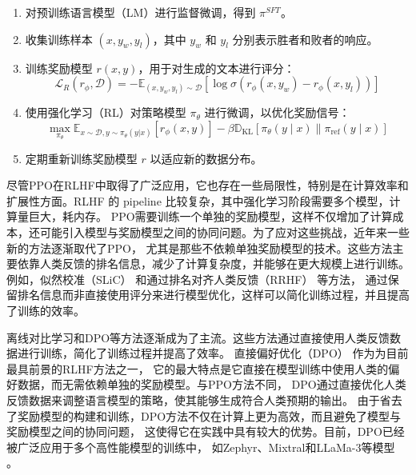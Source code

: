 \begin{enumerate}
    \item 对预训练语言模型（LM）进行监督微调，得到 $\pi^{SFT}$。
    \item 收集训练样本 $(x, y_w, y_l)$，其中 $y_w$ 和 $y_l$ 分别表示胜者和败者的响应。
    \item 训练奖励模型 $r(x, y)$，用于对生成的文本进行评分：
        \begin{equation}
            \mathcal{L}_R(r_\phi,\mathcal{D})=-\mathbb{E}_{(x,y_w,y_l)\sim\mathcal{D}}\left[\log\sigma(r_\phi(x,y_w)-r_\phi(x,y_l))\right]
        \end{equation}
    \item 使用强化学习（RL）对策略模型 $\pi_{\theta}$ 进行微调，以优化奖励信号：
        \begin{equation}
            \max_{\pi_\theta}\mathbb{E}_{x\sim\mathcal{D},y\sim\pi_\theta(y|x)}[r_\phi(x,y)]-\beta\mathbb{D}_{\mathrm{KL}}[\pi_\theta(y\mid x)\parallel\pi_{\mathrm{ref}}(y\mid x)]
        \end{equation}
    \item 定期重新训练奖励模型 $r$ 以适应新的数据分布。
\end{enumerate}

尽管PPO在RLHF中取得了广泛应用，它也存在一些局限性，特别是在计算效率和扩展性方面。RLHF 的 pipeline 比较复杂，其中强化学习阶段需要多个模型，计算量巨大，耗内存。
PPO需要训练一个单独的奖励模型，这样不仅增加了计算成本，还可能引入模型与奖励模型之间的协同问题。为了应对这些挑战，近年来一些新的方法逐渐取代了PPO，
尤其是那些不依赖单独奖励模型的技术。这些方法主要依靠人类反馈的排名信息，减少了计算复杂度，并能够在更大规模上进行训练。
例如，似然校准（SLiC） \citep{zhao2023slic} 和通过排名对齐人类反馈（RRHF） \citep{yuan2023rrhf}等方法，
通过保留排名信息而非直接使用评分来进行模型优化，这样可以简化训练过程，并且提高了训练的效率。

离线对比学习和DPO等方法逐渐成为了主流。这些方法通过直接使用人类反馈数据进行训练，简化了训练过程并提高了效率。
直接偏好优化（DPO） \citep{rafailov2023direct} 作为为目前最具前景的RLHF方法之一，
它的最大特点是它直接在模型训练中使用人类的偏好数据，而无需依赖单独的奖励模型。与PPO方法不同，
DPO通过直接优化人类反馈数据来调整语言模型的策略，使其能够生成符合人类预期的输出。
由于省去了奖励模型的构建和训练，DPO方法不仅在计算上更为高效，而且避免了模型与奖励模型之间的协同问题，
这使得它在实践中具有较大的优势。目前，DPO已经被广泛应用于多个高性能模型的训练中，
如Zephyr、Mixtral和LLaMa-3等模型 \citep{tunstall2023zephyr, jiang2024mixtral}。


